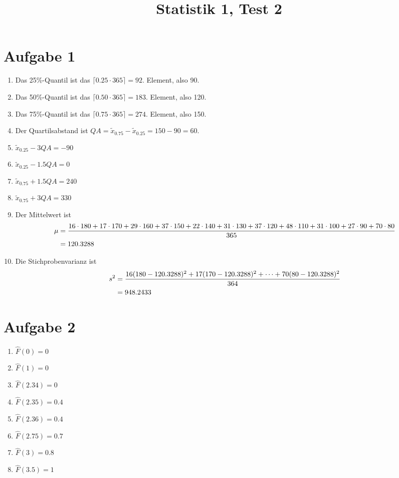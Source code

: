 \documentclass{article}
\title{\textbf{Statistik 1, Test 2}}
\date{}
\begin{document}
	\maketitle
	
	\section*{Aufgabe 1}
	\begin{enumerate}[label=(\alph*)]
		\item Das 25\%-Quantil ist das $\lceil 0.25\cdot 365\rceil = 92$. Element, also 90.
		\item Das 50\%-Quantil ist das $\lceil 0.50\cdot 365\rceil = 183$. Element, also 120.
		\item Das 75\%-Quantil ist das $\lceil 0.75\cdot 365\rceil = 274$. Element, also 150.
		\item Der Quartilsabstand ist $QA = \tilde{x}_{0.75} - \tilde{x}_{0.25}=150-90=60$.
		\item $\tilde{x}_{0.25}-3QA = -90$
		\item $\tilde{x}_{0.25}-1.5QA = 0$
		\item $\tilde{x}_{0.75}+1.5QA = 240$
		\item $\tilde{x}_{0.75}+3QA = 330$
		\item Der Mittelwert ist
		\begin{align}
			\mu &= \frac{16\cdot 180 + 17\cdot 170 + 29\cdot 160 + 37\cdot 150 + 22\cdot 140 + 31\cdot 130 + 37\cdot 120 + 48\cdot 110 + 31\cdot 100 + 27\cdot 90 + 70\cdot 80}{365} \notag \\
			&= 120.3288 \notag
		\end{align}
		\item Die Stichprobenvarianz ist
		\begin{align}
			s^2 &= \frac{16(180-120.3288)^2 + 17(170-120.3288)^2 + \dots + 70(80-120.3288)^2}{364} \notag \\
			&= 948.2433 \notag
		\end{align}
	\end{enumerate}

	\section*{Aufgabe 2}
	\begin{enumerate}[label=(\alph*)]
		\item $\hat{F}(0) = 0$
		\item $\hat{F}(1) = 0$
		\item $\hat{F}(2.34) = 0$
		\item $\hat{F}(2.35) = 0.4$
		\item $\hat{F}(2.36) = 0.4$
		\item $\hat{F}(2.75) = 0.7$
		\item $\hat{F}(3) = 0.8$
		\item $\hat{F}(3.5) = 1$
	\end{enumerate}
\end{document}
